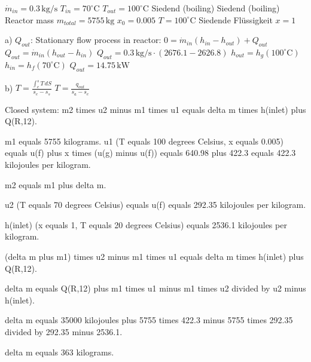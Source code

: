 \( \dot{m}_{in} = 0.3 \, \text{kg/s} \)  
\( T_{in} = 70^\circ \text{C} \)  
\( T_{out} = 100^\circ \text{C} \)  
Siedend (boiling)  
Siedend (boiling)  
Reactor mass \( m_{total} = 5755 \, \text{kg} \)  
\( x_0 = 0.005 \)  
\( T = 100^\circ \text{C} \)  
Siedende Flüssigkeit \( x = 1 \)  

a) \( Q_{out} \): Stationary flow process in reactor:  
\( 0 = \dot{m}_{in} (h_{in} - h_{out}) + Q_{out} \)  
\( Q_{out} = \dot{m}_{in} (h_{out} - h_{in}) \)  
\( Q_{out} = 0.3 \, \text{kg/s} \cdot (2676.1 - 2626.8) \)  
\( h_{out} = h_g (100^\circ \text{C}) \)  
\( h_{in} = h_f (70^\circ \text{C}) \)  
\( Q_{out} = 14.75 \, \text{kW} \)  

b)  
\( T = \frac{\int_e^s T \, dS}{s_e - s_s} \)  
\( T = \frac{q_{out}}{s_a - s_e} \)

Closed system:  
m2 times u2 minus m1 times u1 equals delta m times h(inlet) plus Q(R,12).  

m1 equals 5755 kilograms.  
u1 (T equals 100 degrees Celsius, x equals 0.005) equals u(f) plus x times (u(g) minus u(f)) equals 640.98 plus 422.3 equals 422.3 kilojoules per kilogram.  

m2 equals m1 plus delta m.  

u2 (T equals 70 degrees Celsius) equals u(f) equals 292.35 kilojoules per kilogram.  

h(inlet) (x equals 1, T equals 20 degrees Celsius) equals 2536.1 kilojoules per kilogram.  

(delta m plus m1) times u2 minus m1 times u1 equals delta m times h(inlet) plus Q(R,12).  

delta m equals Q(R,12) plus m1 times u1 minus m1 times u2 divided by u2 minus h(inlet).  

delta m equals 35000 kilojoules plus 5755 times 422.3 minus 5755 times 292.35 divided by 292.35 minus 2536.1.  

delta m equals 363 kilograms.